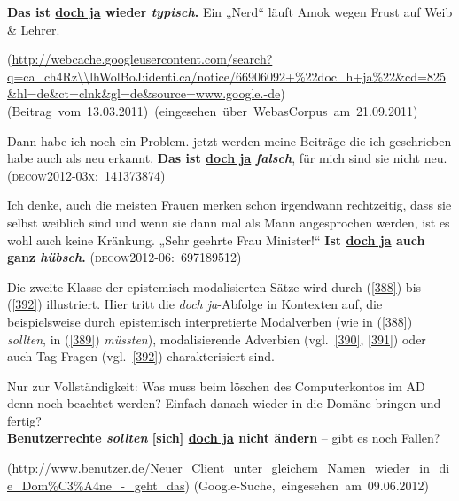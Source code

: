 \begin{exe}
	\ex\label{385}

	 \textbf{Das ist \underline{doch ja} wieder \textit{typisch}.} Ein „Nerd“ läuft Amok wegen Frust auf Weib \&
 		Lehrer.
 	\begin{sloppypar} {\scriptsize(\url{http://webcache.googleusercontent.com/search?q=ca\_ch4Rz\\lhWolBoJ:identi.ca/notice/66906092+\%22doc\_h+ja\%22\&cd=825\&hl=de\&ct=clnk\&gl=de\&source=www.google.-de})}
	\newline
	\hbox{}\hfill\hbox{(Beitrag vom 13.03.2011) (eingesehen über WebasCorpus am 21.09.2011)}						
	\newline
	\hbox{}\hfill\hbox{\citet[176]{Mueller2014a}}	 \end{sloppypar}
\end{exe}

\begin{exe}
	\ex\label{386}

	Dann habe ich noch ein Problem. jetzt werden meine Beiträge die ich geschrieben habe auch als neu erkannt. \textbf{Das ist \underline{doch ja} 				\textit{falsch}}, für mich sind sie nicht neu. 
	\hfill\hbox{\scshape(decow2012-03x: 141373874)}	 
\end{exe}

\begin{exe}
	\ex\label{387}

	Ich denke, auch die meisten Frauen merken schon irgendwann rechtzeitig, dass sie selbst weiblich sind und wenn sie dann mal als Mann angesprochen 			werden, ist es wohl auch keine Kränkung. „Sehr geehrte Frau Minister!“ \textbf{Ist \underline{doch ja} auch ganz \textit{hübsch}.} 
	\hfill\hbox{\scshape(decow2012-06: 697189512)}	 
	\newline
	\hbox{}\hfill\hbox{\citet[201]{Mueller2014a}}	
\end{exe}
Die zweite Klasse der epistemisch modalisierten Sätze wird durch (\ref{388}) bis (\ref{392}) illustriert. Hier tritt die \textit{doch ja}-Abfolge in Kontexten auf, die beispielsweise durch  epistemisch interpretierte Modalverben (wie in (\ref{388}) \textit{sollten}, in (\ref{389}) \textit{müssten}),  modalisierende Adverbien (vgl.\ \ref{390}, \ref{391}) oder auch Tag-Fragen (vgl.\ \ref{392}) charakterisiert sind.\largerpage
													         	     
\begin{exe}
	\ex\label{388}

	Nur zur Vollständigkeit: Was muss beim löschen des Computerkontos im AD denn noch beachtet werden? Einfach danach wieder in die Domäne bringen und 			fertig?\\
	\textbf{Benutzerrechte \textit{sollten} [sich] \underline{doch ja} nicht ändern} – gibt es noch Fallen? 
	\begin{sloppypar}
	{\scriptsize(\url{http://www.benutzer.de/Neuer\_Client\_unter\_gleichem\_Namen\_wieder\_in\_die\_Dom\%C3\%A4ne\_-\_geht\_das})}
	\hfill\hbox{(Google-Suche, eingesehen am 09.06.2012)}\end{sloppypar}
\end{exe}																   	

